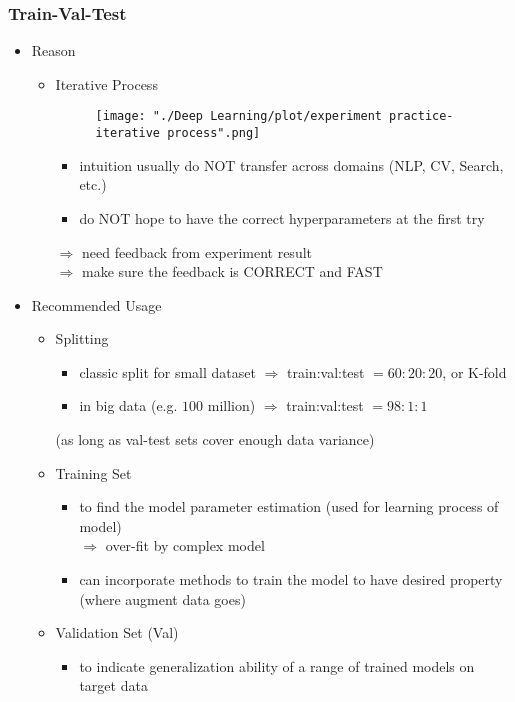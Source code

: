 \subsubsection{Train-Val-Test}
\begin{itemize}
\item Reason
	\begin{itemize}
	\item Iterative Process
		\begin{figure}[!ht]
		\texttt{[image: "./Deep Learning/plot/experiment practice-iterative process".png]}
		\end{figure}
		\begin{itemize}
		\item intuition usually do NOT transfer across domains (NLP, CV, Search, etc.)
		\item do NOT hope to have the correct hyperparameters at the first try
		\end{itemize}
		$\Rightarrow$ need feedback from experiment result \\
		$\Rightarrow$ make sure the feedback is CORRECT and FAST
	\end{itemize}
\item Recommended Usage
	\begin{itemize}
	\item Splitting 
		\begin{itemize}
		\item classic split for small dataset $\Rightarrow$ train:val:test $= 60:20:20$, or K-fold
		\item in big data (e.g. $100$ million) $\Rightarrow$ train:val:test $= 98:1:1$
		\end{itemize}
		(as long as val-test sets cover enough data variance)
	\item Training Set
		\begin{itemize}
		\item to find the model parameter estimation (used for learning process of model) \\
		$\Rightarrow$ over-fit by complex model
		\item can incorporate methods to train the model to have desired property \\
		(where augment data goes)
		\end{itemize}
	\item Validation Set (Val)
		\begin{itemize}
		\item to indicate generalization ability of a range of trained models on target data \\

\end{itemize}
\end{itemize}
\end{itemize}
